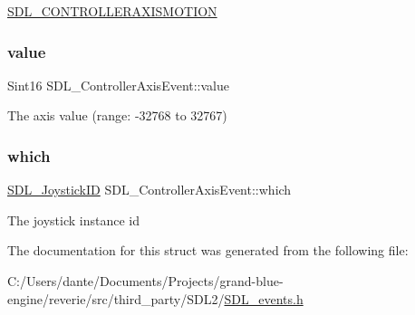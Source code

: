 \mbox{\hyperlink{_s_d_l__events_8h_a3b589e89be6b35c02e0dd34a55f3fccaaca6330126f4126f6a45454fa046c25f3}{S\+D\+L\+\_\+\+C\+O\+N\+T\+R\+O\+L\+L\+E\+R\+A\+X\+I\+S\+M\+O\+T\+I\+ON}} \mbox{\label{struct_s_d_l___controller_axis_event_a1ed7f14255ed01b982d40a38791d475a}} 
\subsubsection{\texorpdfstring{value}{value}}
{\footnotesize\ttfamily Sint16 S\+D\+L\+\_\+\+Controller\+Axis\+Event\+::value}

The axis value (range\+: -\/32768 to 32767) \mbox{\label{struct_s_d_l___controller_axis_event_a07087f68ea9d64b50047d65312ee7b94}} 
\subsubsection{\texorpdfstring{which}{which}}
{\footnotesize\ttfamily \mbox{\hyperlink{_s_d_l__joystick_8h_a3c3d32500cb08f76ee8077983912c0bd}{S\+D\+L\+\_\+\+Joystick\+ID}} S\+D\+L\+\_\+\+Controller\+Axis\+Event\+::which}

The joystick instance id 

The documentation for this struct was generated from the following file\+:\begin{DoxyCompactItemize}
\item 
C\+:/\+Users/dante/\+Documents/\+Projects/grand-\/blue-\/engine/reverie/src/third\+\_\+party/\+S\+D\+L2/\mbox{\hyperlink{_s_d_l__events_8h}{S\+D\+L\+\_\+events.\+h}}\end{DoxyCompactItemize}

